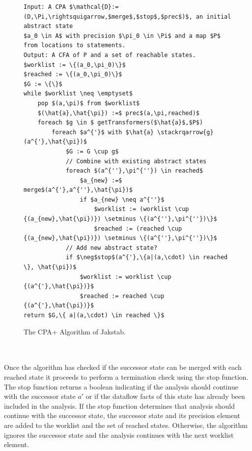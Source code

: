\documentclass{kththesis}
\newcommand\stackrqarrow[1]{%
    \mathrel{\stackon[2pt]{$\rightsquigarrow$}{$\scriptscriptstyle#1$}}}
\begin{document}
\begin{figure}[!htb]
\begin{minipage}{\textwidth}
    \centering
\begin{algorithmFrame}
\begin{lstlisting}[style=algorithm]
Input: A CPA $\mathcal{D}:=(D,\Pi,\rightsquigarrow,$merge$,$stop$,$prec$)$, an initial abstract state
$a_0 \in A$ with precision $\pi_0 \in \Pi$ and a map $P$ from locations to statements.
Output: A CFA of P and a set of reachable states.
$worklist := \{(a_0,\pi_0)\}$
$reached := \{(a_0,\pi_0)\}$
$G := \{\}$
while $worklist \neq \emptyset$
    pop $(a,\pi)$ from $worklist$
    $(\hat{a},\hat{\pi}) :=$ prec$(a,\pi,reached)$
    foreach $g \in $ getTransformers($\hat{a}$,$P$)
        foreach $a^{'}$ with $\hat{a} \stackrqarrow{g} (a^{'},\hat{\pi})$
            $G := G \cup g$
            // Combine with existing abstract states
            foreach $(a^{''},\pi^{''}) \in reached$
                $a_{new} :=$ merge$(a^{'},a^{''},\hat{\pi})$
                if $a_{new} \neq a^{''}$
                    $worklist := (worklist \cup {(a_{new},\hat{\pi})}) \setminus \{(a^{''},\pi^{''})\}$
                    $reached := (reached \cup {(a_{new},\hat{\pi})}) \setminus \{(a^{''},\pi^{''})\}$
            // Add new abstract state?
            if $\neg$stop$(a^{'},\{a|(a,\cdot) \in reached \}, \hat{\pi})$
                $worklist := worklist \cup {(a^{'},\hat{\pi})}$
                $reached := reached \cup {(a^{'},\hat{\pi})}$
return $G,\{ a|(a,\cdot) \in reached \}$
\end{lstlisting}
\end{algorithmFrame}
\caption[The CPA+ Algorithm of Jakstab.]{The CPA+ Algorithm of Jakstab\footnotemark.}
\label{fig:CPAJakstab}
\end{minipage}
\end{figure}
\\ \\
Once the algorithm has checked if the successor state can be merged with each reached state it proceeds to perform a termination check using the stop function. The stop function returns a boolean indicating if the analysis should continue with the successor state $a{'}$ or if the dataflow facts of this state has already been included in the analysis. If the stop function determines that analysis should continue with the successor state, the successor state and its precision element are added to the worklist and the set of reached states. Otherwise, the algorithm ignores the successor state and the analysis continues with the next worklist element. 
\end{document}
